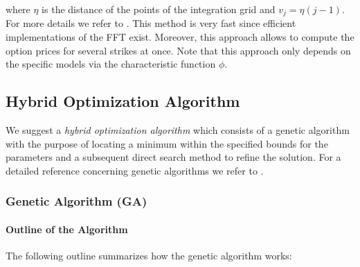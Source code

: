 \documentclass[10pt,a4paper]{article}
\numberwithin{equation}{section} %
\theoremstyle{plain}
\theoremstyle{definition}
\theoremstyle{remark}
\providecommand{\subsubsecref}[1]{Section~\ref{#1}}
\begin{document}
where $\eta$ is the distance of the points of the integration grid and $v_j=\eta(j-1)$. 
For more details we refer to \cite{CM99}. This method is very fast since efficient implementations of the FFT exist. Moreover, this approach allows to compute the option prices for several strikes at once.
Note that this approach only depends on the specific models via the characteristic function $\phi$.


\subsection{Hybrid Optimization Algorithm}

We suggest a \emph{hybrid optimization algorithm} which consists of a genetic algorithm with the purpose of locating a minimum within the specified bounds for the parameters and a subsequent direct search method to refine the solution. For a detailed reference concerning genetic algorithms we refer to \cite{BFM00}.

\subsubsection{Genetic Algorithm (GA)}

\paragraph{Outline of the Algorithm}

The following outline summarizes how the genetic algorithm works:
\end{document}
